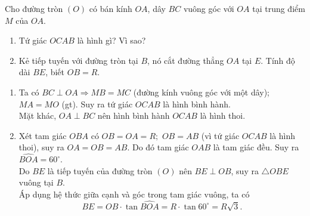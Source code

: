 \begin{vd}
Cho đường tròn $(O)$ có bán kính $OA$, dây $BC$ vuông góc với $OA$ tại trung điểm $M$ của $OA$.
\begin{enumerate}
\item Tứ giác $OCAB$ là hình gì? Vì sao?
\item Kẻ tiếp tuyến với đường tròn tại $B$, nó cắt đường thẳng $OA$ tại $E$. Tính độ dài $BE$, biết $OB=R$.
\end{enumerate}	
\loigiai
{
\begin{center}
\end{center}
\begin{enumerate}
\item Ta có $BC \perp OA \Rightarrow MB=MC$ (đường kính vuông góc với một dây); $MA=MO$ (gt). Suy ra tứ giác $OCAB$ là hình bình hành.\\
Mặt khác, $OA \perp BC$ nên hình bình hành $OCAB$ là hình thoi.
\item Xét tam giác $OBA$ có $OB=OA=R;$ $OB=AB$ (vì tứ giác $OCAB$ là hình thoi), suy ra $OA=OB=AB$. Do đó tam giác $OAB$ là tam giác đều. Suy ra $\widehat{BOA}=60^{\circ}$.\\
Do $BE$ là tiếp tuyến của đường tròn $(O)$ nên $BE \perp OB$, suy ra $\triangle OBE$ vuông tại $B$.\\
Áp dụng hệ thức giữa cạnh và góc trong tam giác vuông, ta có
$$BE =OB \cdot \tan \widehat{BOA}=R \cdot \tan 60^{\circ}=R\sqrt{3}.$$
\end{enumerate}
}
\end{vd}

